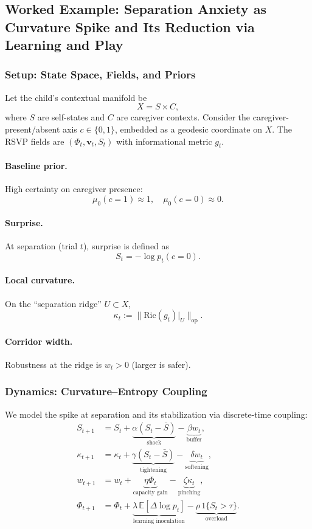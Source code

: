 \documentclass{article}
\theoremstyle{definition}
\begin{document}
\subsection{Worked Example: Separation Anxiety as Curvature Spike and Its Reduction via Learning and Play}

\subsubsection{Setup: State Space, Fields, and Priors}

Let the child’s contextual manifold be 
\[
X = S \times C,
\]
where $S$ are self-states and $C$ are caregiver contexts. Consider the caregiver-present/absent axis $c \in \{0,1\}$, embedded as a geodesic coordinate on $X$. The RSVP fields are $(\Phi_t, \mathbf{v}_t, S_t)$ with informational metric $g_t$.

\paragraph{Baseline prior.} High certainty on caregiver presence:
\[
\mu_0(c=1) \approx 1, \quad \mu_0(c=0) \approx 0.
\]

\paragraph{Surprise.} At separation (trial $t$), surprise is defined as
\[
S_t = - \log p_t(c=0).
\]

\paragraph{Local curvature.} On the ``separation ridge'' $U \subset X$,
\[
\kappa_t := \| \mathrm{Ric}(g_t)|_U \|_{\mathrm{op}}.
\]

\paragraph{Corridor width.} Robustness at the ridge is $w_t > 0$ (larger is safer).

\subsubsection{Dynamics: Curvature–Entropy Coupling}

We model the spike at separation and its stabilization via discrete-time coupling:
\begin{align*}
S_{t+1} &= S_t + \underbrace{\alpha (S_t - \bar{S})}_{\text{shock}}
                     - \underbrace{\beta w_t}_{\text{buffer}}, \\[4pt]
\kappa_{t+1} &= \kappa_t + \underbrace{\gamma (S_t - \bar{S})}_{\text{tightening}}
                     - \underbrace{\delta w_t}_{\text{softening}}, \\[4pt]
w_{t+1} &= w_t + \underbrace{\eta \Phi_t}_{\text{capacity gain}}
                 - \underbrace{\zeta \kappa_t}_{\text{pinching}}, \\[4pt]
\Phi_{t+1} &= \Phi_t + \underbrace{\lambda \, \mathbb{E}[\Delta \log p_t]}_{\text{learning inoculation}}
                      - \underbrace{\rho \, 1\{S_t > \tau\}}_{\text{overload}}.
\end{align*}
\end{document}

